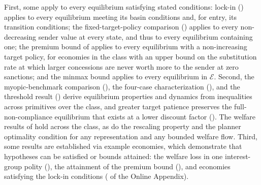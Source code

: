  First, some apply to every
equilibrium satisfying stated conditions: lock-in () applies to every
equilibrium meeting its basin conditions and, for entry, its transition conditions; the
fixed-target-policy comparison () applies to every non-decreasing
sender value at every state, and thus to every equilibrium containing one; the premium bound
of  applies to every equilibrium with a non-increasing target
policy, for economies in the class with an upper bound on the substitution rate at which
larger concessions are never worth more to the sender at zero sanctions; and the minmax
bound applies to every equilibrium in $\mathcal E$. Second, the myopic-benchmark
comparison (), the four-case characterization
(), and the threshold result () derive
equilibrium properties and dynamics from inequalities across primitives over the class, and
greater target patience preserves the full-non-compliance equilibrium that exists at a
lower discount factor (). The welfare results of
 hold across the class, as do the rescaling property and the planner
optimality condition for any representation and any bounded welfare flow. Third, some
results are established via example economies, which demonstrate that hypotheses can be
satisfied or bounds attained: the welfare loss in one interest-group polity
(), the attainment of the premium bound
(), and economies satisfying the lock-in conditions
( of the Online Appendix).

